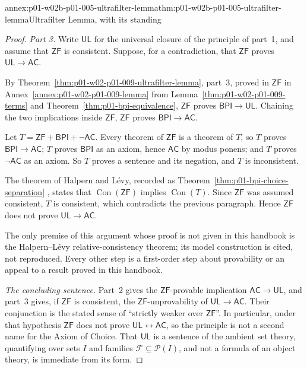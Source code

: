 \begin{annexitem}{annex:p01-w02b-p01-005-ultrafilter-lemma}{thm:p01-w02b-p01-005-ultrafilter-lemma}{Ultrafilter Lemma, with its standing}
\begin{proof}
\emph{Part 3.} Write \(\mathsf{UL}\) for the universal closure of the
principle of part~1, and assume that \(\mathsf{ZF}\) is consistent. Suppose,
for a contradiction, that \(\mathsf{ZF}\) proves
\(\mathsf{UL}\rightarrow\mathsf{AC}\).

By Theorem~\ref{thm:p01-w02-p01-009-ultrafilter-lemma}, part~3, proved in
\(\mathsf{ZF}\) in Annex~\ref{annex:p01-w02-p01-009-lemma} from
Lemma~\ref{thm:p01-w02-p01-009-terms} and Theorem~\ref{thm:p01-bpi-equivalence},
\(\mathsf{ZF}\) proves \(\mathsf{BPI}\rightarrow\mathsf{UL}\). Chaining the
two implications inside \(\mathsf{ZF}\), \(\mathsf{ZF}\) proves
\(\mathsf{BPI}\rightarrow\mathsf{AC}\).

Let \(T=\mathsf{ZF}+\mathsf{BPI}+\neg\mathsf{AC}\). Every theorem of
\(\mathsf{ZF}\) is a theorem of \(T\), so \(T\) proves
\(\mathsf{BPI}\rightarrow\mathsf{AC}\); \(T\) proves \(\mathsf{BPI}\) as an
axiom, hence \(\mathsf{AC}\) by modus ponens; and \(T\) proves
\(\neg\mathsf{AC}\) as an axiom. So \(T\) proves a sentence and its negation,
and \(T\) is inconsistent.

The theorem of Halpern and L\'evy, recorded as
Theorem~\ref{thm:p01-bpi-choice-separation} \cite{HalpernLevy1971}, states
that \(\operatorname{Con}(\mathsf{ZF})\) implies \(\operatorname{Con}(T)\).
Since \(\mathsf{ZF}\) was assumed consistent, \(T\) is consistent, which
contradicts the previous paragraph. Hence \(\mathsf{ZF}\) does not prove
\(\mathsf{UL}\rightarrow\mathsf{AC}\).

The only premise of this argument whose proof is not given in this handbook
is the Halpern--L\'evy relative-consistency theorem; its model construction is
cited, not reproduced. Every other step is a first-order step about
provability or an appeal to a result proved in this handbook.

\emph{The concluding sentence.} Part~2 gives the \(\mathsf{ZF}\)-provable
implication \(\mathsf{AC}\rightarrow\mathsf{UL}\), and part~3 gives, if
\(\mathsf{ZF}\) is consistent, the \(\mathsf{ZF}\)-unprovability of
\(\mathsf{UL}\rightarrow\mathsf{AC}\). Their conjunction is the stated sense
of ``strictly weaker over \(\mathsf{ZF}\)''. In particular, under that
hypothesis \(\mathsf{ZF}\) does not prove
\(\mathsf{UL}\leftrightarrow\mathsf{AC}\), so the principle is not a second
name for the Axiom of Choice. That \(\mathsf{UL}\) is a sentence of the
ambient set theory, quantifying over sets \(I\) and families
\(\mathcal F\subseteq\mathcal P(I)\), and not a formula of an object theory,
is immediate from its form.
\end{proof}
\end{annexitem}
